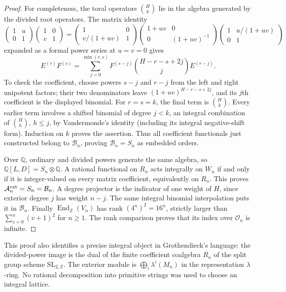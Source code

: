 \begin{proof}
For completeness, the toral operators $\binom Hk$ lie in the algebra
generated by the divided root operators. The matrix identity
\[
 \begin{pmatrix}1&u\\0&1\end{pmatrix}
 \begin{pmatrix}1&0\\v&1\end{pmatrix}
 =\begin{pmatrix}1&0\\v/(1+uv)&1\end{pmatrix}
  \begin{pmatrix}1+uv&0\\0&(1+uv)^{-1}\end{pmatrix}
  \begin{pmatrix}1&u/(1+uv)\\0&1\end{pmatrix}
\]
expanded as a formal power series at $u=v=0$ gives
\[
 E^{(r)}F^{(s)}=
 \sum_{j=0}^{\min(r,s)}F^{(s-j)}
 \binom{H-r-s+2j}{j}E^{(r-j)}. \tag{IF-02a}
\]
To check the coefficient, choose powers $s-j$ and $r-j$ from the
left and right unipotent factors; their two denominators leave
$(1+uv)^{H-r-s+2j}$, and its $j$th coefficient is the displayed
binomial. For $r=s=k$, the final term is $\binom Hk$. Every earlier
term involves a shifted binomial of degree $j<k$, an integral
combination of $\binom Hh$, $h\leq j$, by Vandermonde's identity
(including its integral negative-shift form). Induction on $k$ proves
the assertion. Thus all coefficient functionals just constructed belong
to $\mathcal B_n$, proving $\mathcal B_n=S_n$ as embedded orders.

Over $\mathbb Q$, ordinary and divided powers generate the same algebra,
so $\mathbb Q[L,D]=S_n\otimes\mathbb Q$. A rational functional on
$R_n$ acts integrally on $W_n$ if and only if it is integer-valued on
every matrix coefficient, equivalently on $R_n$. This proves
$\mathcal A_n^{\rm ext}=S_n=\mathcal B_n$. A degree projector is the
indicator of one weight of $H$, since exterior degree $j$ has weight
$n-j$. The same integral binomial interpolation puts it in
$\mathcal B_n$. Finally $\operatorname{End}_{\mathbb Z}(V_n)$ has rank
$(4^n)^2=16^n$, strictly larger than $\sum_{v=0}^n(v+1)^2$ for
$n\geq1$. The rank comparison proves that its index over $\mathcal O_n$
is infinite.
\end{proof}

This proof also identifies a precise integral object in Grothendieck's
language: the divided-power image is the dual of the finite coefficient
coalgebra $R_n$ of the split group scheme $\mathrm{SL}_{2,\mathbb Z}$.
The exterior module is $\bigoplus_i\lambda^i(M_n)$ in the representation
$\lambda$-ring. No rational decomposition into primitive strings was
used to choose an integral lattice.

